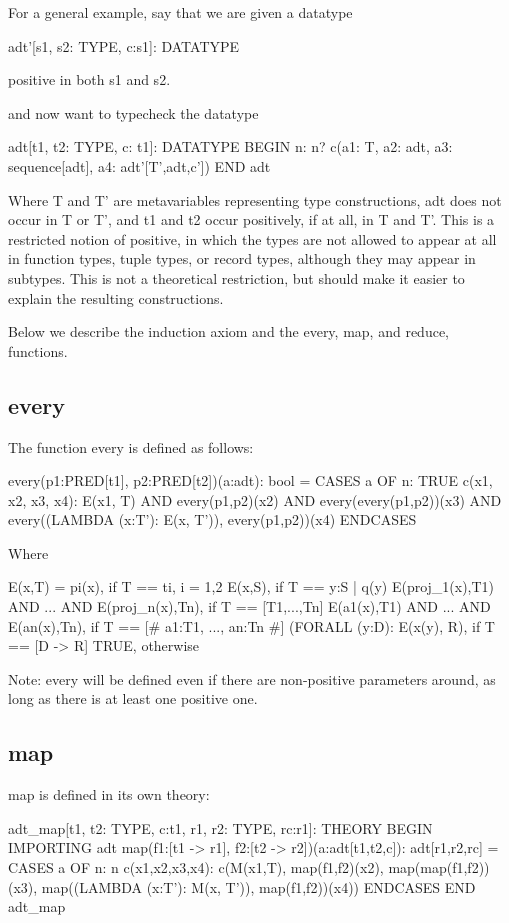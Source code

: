 For a general example, say that we are given a datatype

adt'[s1, s2: TYPE, c:s1]: DATATYPE

positive in both s1 and s2.

and now want to typecheck the datatype

adt[t1, t2: TYPE, c: t1]: DATATYPE
 BEGIN
  n: n?
  c(a1: T,
    a2: adt,
    a3: sequence[adt],
    a4: adt'[T',adt,c'])
 END adt

Where T and T' are metavariables representing type constructions, adt
does not occur in T or T', and t1 and t2 occur positively, if at all,
in T and T'.  This is a restricted notion of positive, in which the
types are not allowed to appear at all in function types, tuple types,
or record types, although they may appear in subtypes.  This is not a
theoretical restriction, but should make it easier to explain the
resulting constructions.

Below we describe the induction axiom and the every, map, and reduce,
functions.

\subsection{every}
The function every is defined as follows:

every(p1:PRED[t1], p2:PRED[t2])(a:adt): bool =
  CASES a OF
    n: TRUE
    c(x1, x2, x3, x4):
      E(x1, T) AND
      every(p1,p2)(x2) AND
      every(every(p1,p2))(x3) AND
      every((LAMBDA (x:T'): E(x, T')), every(p1,p2))(x4)
  ENDCASES

Where

E(x,T) = pi(x),		if T == ti, i = 1,2
         E(x,S),	if T == {y:S | q(y)}
         E(proj_1(x),T1) AND ... AND E(proj_n(x),Tn), if T == [T1,...,Tn]
         E(a1(x),T1) AND ... AND E(an(x),Tn), if T == [# a1:T1, ..., an:Tn #]
         (FORALL (y:D): E(x(y), R), if T == [D -> R]
       	 TRUE,		otherwise

Note: every will be defined even if there are non-positive parameters
around, as long as there is at least one positive one.

\subsection{map}
map is defined in its own theory:

adt_map[t1, t2: TYPE, c:t1, r1, r2: TYPE, rc:r1]: THEORY
 BEGIN
  IMPORTING adt
  map(f1:[t1 -> r1], f2:[t2 -> r2])(a:adt[t1,t2,c]): adt[r1,r2,rc] =
    CASES a OF
      n: n
      c(x1,x2,x3,x4):
        c(M(x1,T),
          map(f1,f2)(x2),
          map(map(f1,f2))(x3),
          map((LAMBDA (x:T'): M(x, T')), map(f1,f2))(x4))
     ENDCASES
 END adt_map

